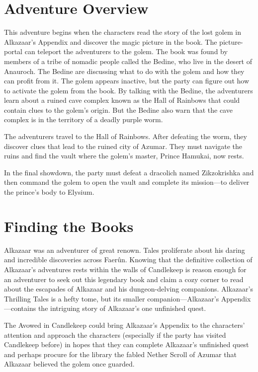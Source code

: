\documentclass[10pt,a4paper,twoside,bg=print,twocolumn,openany,nodeprecatedcode]{dndbook}
\begin{document}
\section{Adventure Overview}
This adventure begins when the characters read the story of the lost golem in Alkazaar's Appendix and discover the magic picture in the book. The picture-portal can teleport the adventurers to the golem. The book was found by members of a tribe of nomadic people called the Bedine, who live in the desert of Anauroch. The Bedine are discussing what to do with the golem and how they can profit from it. The golem appears inactive, but the party can figure out how to activate the golem from the book. By talking with the Bedine, the adventurers learn about a ruined cave complex known as the Hall of Rainbows that could contain clues to the golem's origin. But the Bedine also warn that the cave complex is in the territory of a deadly purple worm.

The adventurers travel to the Hall of Rainbows. After defeating the worm, they discover clues that lead to the ruined city of Azumar. They must navigate the ruins and find the vault where the golem's master, Prince Hamukai, now rests.

In the final showdown, the party must defeat a dracolich named Zikzokrishka and then command the golem to open the vault and complete its mission—to deliver the prince's body to Elysium.

\section{Finding the Books}
Alkazaar was an adventurer of great renown. Tales proliferate about his daring and incredible discoveries across Faerûn. Knowing that the definitive collection of Alkazaar's adventures rests within the walls of Candlekeep is reason enough for an adventurer to seek out this legendary book and claim a cozy corner to read about the escapades of Alkazaar and his dungeon-delving companions. Alkazaar's Thrilling Tales is a hefty tome, but its smaller companion—Alkazaar's Appendix—contains the intriguing story of Alkazaar's one unfinished quest.

The Avowed in Candlekeep could bring Alkazaar's Appendix to the characters' attention and approach the characters (especially if the party has visited Candlekeep before) in hopes that they can complete Alkazaar's unfinished quest and perhaps procure for the library the fabled Nether Scroll of Azumar that Alkazaar believed the golem once guarded.
\end{document}

